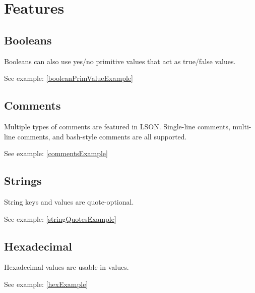\documentclass[12pt]{article}
\begin{document}
\newpage

\section{Features}
\subsection{Booleans}
Booleans can also use yes/no primitive values that act as true/false values.

See example: \ref{booleanPrimValueExample}

\subsection{Comments}
Multiple types of comments are featured in LSON. Single-line comments, multi-line comments, and bash-style comments are all supported.

See example: \ref{commentsExample}

\subsection{Strings}
String keys and values are quote-optional.

See example: \ref{stringQuotesExample}

\subsection{Hexadecimal}
Hexadecimal values are usable in values.

See example: \ref{hexExample}
\end{document}
